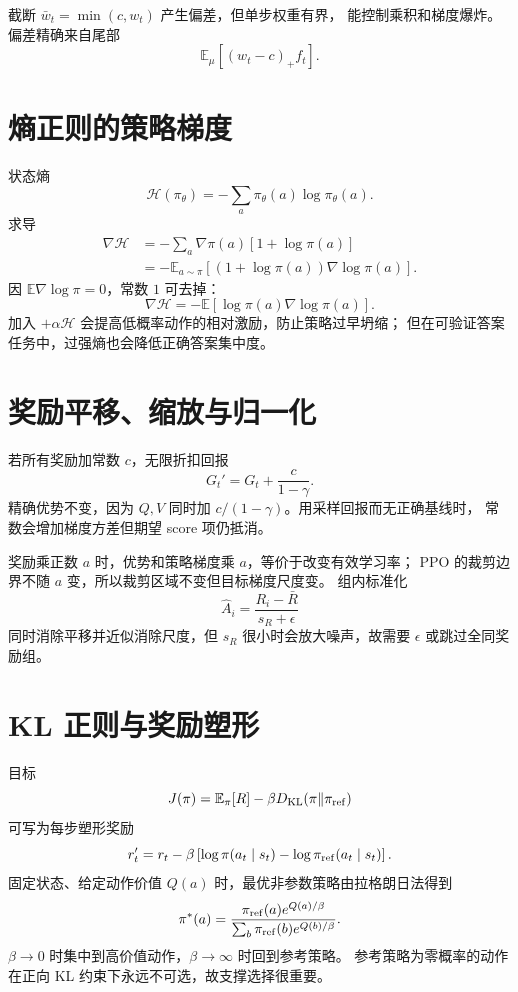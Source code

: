 \documentclass[11pt]{article}
\numberwithin{equation}{section}
\newcommand{\E}{\mathbb{E}}
\newcommand{\1}{\mathbf{1}}
\begin{document}
截断 $\bar w_t=\min(c,w_t)$ 产生偏差，但单步权重有界，
能控制乘积和梯度爆炸。偏差精确来自尾部
\begin{equation}
 \E_\mu[(w_t-c)_+f_t].
\end{equation}

\section{熵正则的策略梯度}

状态熵
\begin{equation}
 \mathcal H(\pi_\theta)=-\sum_a\pi_\theta(a)\log\pi_\theta(a).
\end{equation}
求导
\begin{align}
 \nabla\mathcal H
 &=-\sum_a\nabla\pi(a)[1+\log\pi(a)]\\
 &=-\E_{a\sim\pi}
 [(1+\log\pi(a))\nabla\log\pi(a)].
\end{align}
因 $\E\nabla\log\pi=0$，常数 $1$ 可去掉：
\begin{equation}
 \nabla\mathcal H
 =-\E[\log\pi(a)\nabla\log\pi(a)].
\end{equation}
加入 $+\alpha\mathcal H$ 会提高低概率动作的相对激励，防止策略过早坍缩；
但在可验证答案任务中，过强熵也会降低正确答案集中度。

\section{奖励平移、缩放与归一化}

若所有奖励加常数 $c$，无限折扣回报
\begin{equation}
 G_t'=G_t+\frac{c}{1-\gamma}.
\end{equation}
精确优势不变，因为 $Q,V$ 同时加 $c/(1-\gamma)$。用采样回报而无正确基线时，
常数会增加梯度方差但期望 score 项仍抵消。

奖励乘正数 $a$ 时，优势和策略梯度乘 $a$，等价于改变有效学习率；
PPO 的裁剪边界不随 $a$ 变，所以裁剪区域不变但目标梯度尺度变。
组内标准化
\begin{equation}
 \widehat A_i=\frac{R_i-\bar R}{s_R+\epsilon}
\end{equation}
同时消除平移并近似消除尺度，但 $s_R$ 很小时会放大噪声，故需要 $\epsilon$ 或跳过全同奖励组。

\section{KL 正则与奖励塑形}

目标
\begin{equation}
 J(\pi)=\E_\pi[R]-\beta D_{\rm KL}(\pi\|\pi_{\rm ref})
\end{equation}
可写为每步塑形奖励
\begin{equation}
 r_t'=r_t-\beta
 \left[\log\pi(a_t\mid s_t)-\log\pi_{\rm ref}(a_t\mid s_t)\right].
\end{equation}
固定状态、给定动作价值 $Q(a)$ 时，最优非参数策略由拉格朗日法得到
\begin{equation}
 \pi^*(a)=\frac{\pi_{\rm ref}(a)e^{Q(a)/\beta}}
 {\sum_b\pi_{\rm ref}(b)e^{Q(b)/\beta}}.
\end{equation}
$\beta\to0$ 时集中到高价值动作，$\beta\to\infty$ 时回到参考策略。
参考策略为零概率的动作在正向 KL 约束下永远不可选，故支撑选择很重要。
\end{document}
